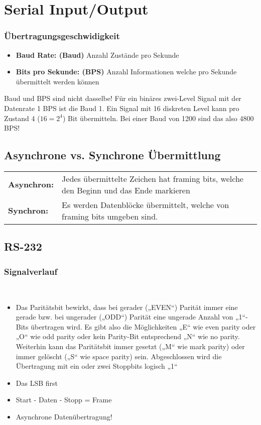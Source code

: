 \section{Serial Input/Output}

\subsubsection{Übertragungsgeschwidigkeit}
\begin{itemize}
  \item \textbf{Baud Rate: (Baud)} Anzahl Zustände pro Sekunde
  \item \textbf{Bits pro Sekunde: (BPS)} Anzahl Informationen welche pro Sekunde übermittelt werden können
\end{itemize}
Baud und BPS sind nicht dasselbe! Für ein binäres zwei-Level Signal mit der Datenrate 1 BPS ist die Baud 1.
Ein Signal mit 16 diskreten Level kann pro Zustand 4 ($16=2^4$) Bit übermitteln. Bei einer Baud von 1200 sind das also 4800 BPS! 

\subsection{Asynchrone vs. Synchrone Übermittlung}
\begin{tabular}{ll}
	\textbf{Asynchron:}	& Jedes übermittelte Zeichen hat framing bits, welche den Beginn und das Ende markieren \\
	\textbf{Synchron:}	& Es werden Datenblöcke übermittelt, welche von framing	bits umgeben sind.
\end{tabular}

\subsection{RS-232}
\subsubsection{Signalverlauf}
	\\
  \begin{itemize}
    \item Das Paritätsbit bewirkt, dass bei gerader („EVEN“) Parität immer eine
    gerade bzw. bei ungerader („ODD“) Parität eine ungerade Anzahl von „1“-Bits übertragen wird. Es gibt also die Möglichkeiten „E“ wie even parity oder „O“ wie odd parity oder kein Parity-Bit entsprechend „N“ wie no parity. Weiterhin kann das Paritätsbit immer gesetzt („M“ wie mark parity) oder immer gelöscht („S“ wie space parity) sein. Abgeschlossen wird die Übertragung mit ein oder zwei Stoppbits logisch „1“
    \item Das LSB first
    \item Start - Daten - Stopp = Frame
    \item Asynchrone Datenübertragung! 
  \end{itemize}
